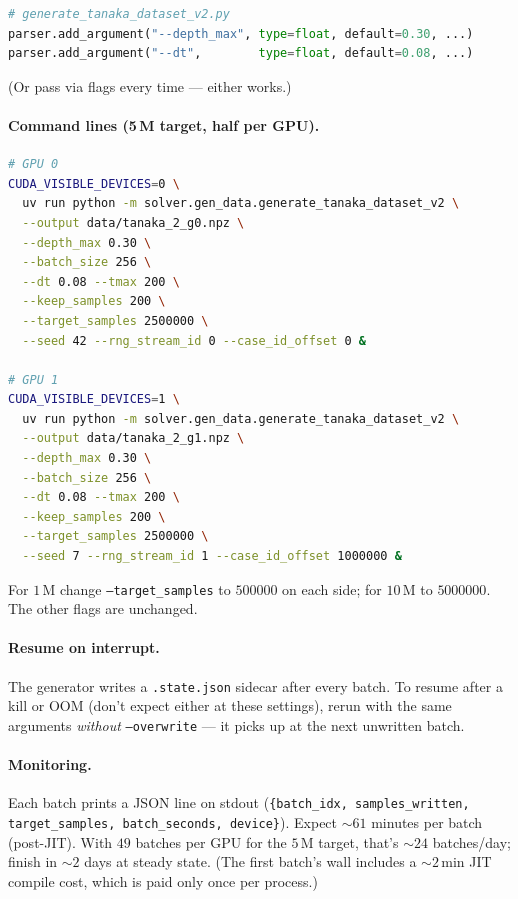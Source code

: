 \documentclass[11pt]{article}
\begin{document}
\begin{lstlisting}[language=Python]
# generate_tanaka_dataset_v2.py
parser.add_argument("--depth_max", type=float, default=0.30, ...)
parser.add_argument("--dt",        type=float, default=0.08, ...)
\end{lstlisting}

(Or pass via flags every time --- either works.)

\paragraph{Command lines (5\,M target, half per GPU).}

\begin{lstlisting}[language=bash]
# GPU 0
CUDA_VISIBLE_DEVICES=0 \
  uv run python -m solver.gen_data.generate_tanaka_dataset_v2 \
  --output data/tanaka_2_g0.npz \
  --depth_max 0.30 \
  --batch_size 256 \
  --dt 0.08 --tmax 200 \
  --keep_samples 200 \
  --target_samples 2500000 \
  --seed 42 --rng_stream_id 0 --case_id_offset 0 &

# GPU 1
CUDA_VISIBLE_DEVICES=1 \
  uv run python -m solver.gen_data.generate_tanaka_dataset_v2 \
  --output data/tanaka_2_g1.npz \
  --depth_max 0.30 \
  --batch_size 256 \
  --dt 0.08 --tmax 200 \
  --keep_samples 200 \
  --target_samples 2500000 \
  --seed 7 --rng_stream_id 1 --case_id_offset 1000000 &
\end{lstlisting}

For $1$\,M change \texttt{--target\_samples} to $500000$ on each side; for $10$\,M to
$5000000$. The other flags are unchanged.

\paragraph{Resume on interrupt.} The generator writes a \texttt{.state.json} sidecar
after every batch. To resume after a kill or OOM (don't expect either at these
settings), rerun with the same arguments \emph{without} \texttt{--overwrite} ---
it picks up at the next unwritten batch.

\paragraph{Monitoring.} Each batch prints a JSON line on stdout
(\texttt{\{batch\_idx, samples\_written, target\_samples, batch\_seconds, device\}}).
Expect $\sim\!61$ minutes per batch (post-JIT). With $49$ batches per GPU for the
$5$\,M target, that's $\sim\!24$ batches/day; finish in $\sim\!2$ days at steady
state. (The first batch's wall includes a $\sim\!2$\,min JIT compile cost, which
is paid only once per process.)
\end{document}
